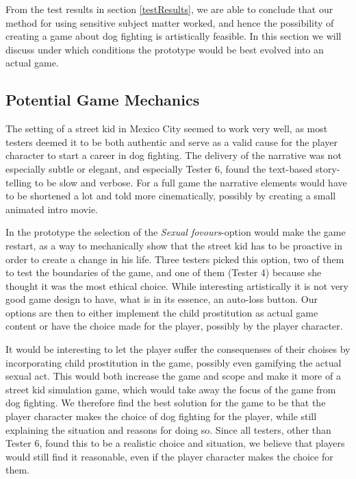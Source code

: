 From the test results in section \ref{testResults}, we are able to conclude that our method for using sensitive subject matter worked, and hence the possibility of creating a game about dog fighting is artistically feasible. In this section we will discuss under which conditions the prototype would be best evolved into an actual game.\

\subsection{Potential Game Mechanics}
The setting of a street kid in Mexico City seemed to work very well, as most testers deemed it to be both authentic and serve as a valid cause for the player character to start a career in dog fighting. The delivery of the narrative was not especially subtle or elegant, and especially Tester 6, found the text-based story-telling to be slow and verbose. For a full game the narrative elements would have to be shortened a lot and told more cinematically, possibly by creating a small animated intro movie. \

In the prototype the selection of the \textit{Sexual fovours}-option would make the game restart, as a way to mechanically show that the street kid has to be proactive in order to create a change in his life. Three testers picked this option, two of them to test the boundaries of the game, and one of them (Tester 4) because she thought it was the most ethical choice. While interesting artistically it is not very good game design to have, what is in its essence, an auto-loss button. Our options are then to either implement the child prostitution as actual game content or have the choice made for the player, possibly by the player character.\

It would be interesting to let the player suffer the consequenses of their choises by incorporating child prostitution in the game, possibly even gamifying the actual sexual act. This would both increase the game and scope and make it more of a street kid simulation game, which would take away the focus of the game from dog fighting. We therefore find the best solution for the game to be that the player character makes the choice of dog fighting for the player, while still explaining the situation and reasons for doing so. Since all testers, other than Tester 6, found this to be a realistic choice and situation, we believe that players would still find it reasonable, even if the player character makes the choice for them.\

